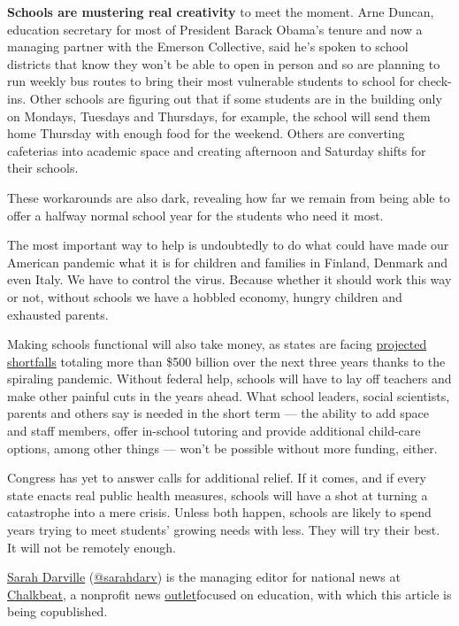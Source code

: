 \textbf{Schools are mustering real creativity} to meet the moment. Arne
Duncan, education secretary for most of President Barack Obama's tenure
and now a managing partner with the Emerson Collective, said he's spoken
to school districts that know they won't be able to open in person and
so are planning to run weekly bus routes to bring their most vulnerable
students to school for check-ins. Other schools are figuring out that if
some students are in the building only on Mondays, Tuesdays and
Thursdays, for example, the school will send them home Thursday with
enough food for the weekend. Others are converting cafeterias into
academic space and creating afternoon and Saturday shifts for their
schools.

These workarounds are also dark, revealing how far we remain from being
able to offer a halfway normal school year for the students who need it
most.

The most important way to help is undoubtedly to do what could have made
our American pandemic what it is for children and families in Finland,
Denmark and even Italy. We have to control the virus. Because whether it
should work this way or not, without schools we have a hobbled economy,
hungry children and exhausted parents.

Making schools functional will also take money, as states are facing
\href{https://www.cbpp.org/research/state-budget-and-tax/states-continue-to-face-large-shortfalls-due-to-covid-19-effects}{projected
shortfalls} totaling more than \$500 billion over the next three years
thanks to the spiraling pandemic. Without federal help, schools will
have to lay off teachers and make other painful cuts in the years ahead.
What school leaders, social scientists, parents and others say is needed
in the short term --- the ability to add space and staff members, offer
in-school tutoring and provide additional child-care options, among
other things --- won't be possible without more funding, either.

Congress has yet to answer calls for additional relief. If it comes, and
if every state enacts real public health measures, schools will have a
shot at turning a catastrophe into a mere crisis. Unless both happen,
schools are likely to spend years trying to meet students' growing needs
with less. They will try their best. It will not be remotely enough.

\href{https://www.chalkbeat.org/authors/sarah-darville}{Sarah Darville}
(\href{https://twitter.com/sarahdarv?lang=en}{@sarahdarv}) is the
managing editor for national news at
\href{https://www.chalkbeat.org/}{Chalkbeat}, a nonprofit news
\href{https://www.chalkbeat.org/pages/newsletters}{outlet}focused on
education, with which this article is being copublished.

